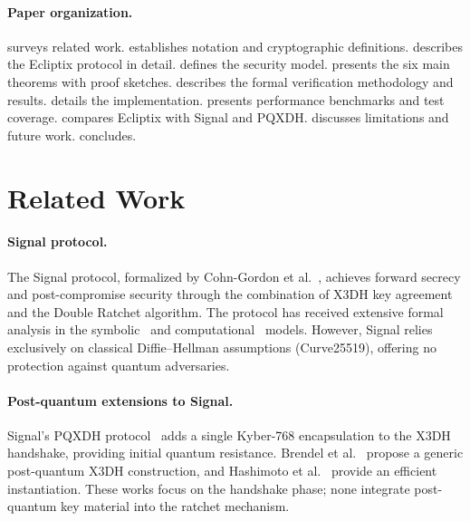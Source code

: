 \documentclass[11pt,a4paper]{article}
\theoremstyle{definition}
\begin{document}
\paragraph{Paper organization.}
 surveys related work.  establishes notation and cryptographic definitions.  describes the Ecliptix protocol in detail.  defines the security model.  presents the six main theorems with proof sketches.  describes the formal verification methodology and results.  details the implementation.  presents performance benchmarks and test coverage.  compares Ecliptix with Signal and PQXDH.  discusses limitations and future work.  concludes.


\section{Related Work}\label{sec:related}

\paragraph{Signal protocol.}
The Signal protocol, formalized by Cohn-Gordon et al.~\cite{cohn-gordon2020}, achieves forward secrecy and post-compromise security through the combination of X3DH key agreement~\cite{signal-x3dh} and the Double Ratchet algorithm. The protocol has received extensive formal analysis in the symbolic~\cite{cohn-gordon2020} and computational~\cite{lamacchia2007} models. However, Signal relies exclusively on classical Diffie--Hellman assumptions (Curve25519), offering no protection against quantum adversaries.

\paragraph{Post-quantum extensions to Signal.}
Signal's PQXDH protocol~\cite{signal-pqxdh} adds a single Kyber-768 encapsulation to the X3DH handshake, providing initial quantum resistance. Brendel et al.~\cite{brendel2020} propose a generic post-quantum X3DH construction, and Hashimoto et al.~\cite{hashimoto2021} provide an efficient instantiation. These works focus on the handshake phase; none integrate post-quantum key material into the ratchet mechanism.
\end{document}
